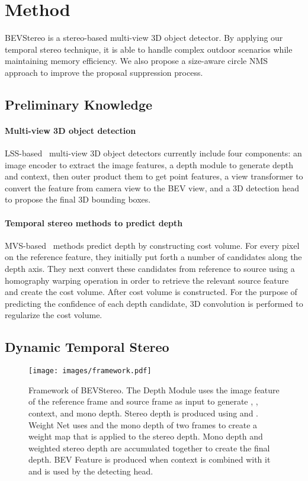 \documentclass[letterpaper]{article} \usepackage[]{aaai23}  \usepackage{times}  \usepackage{helvet}  \usepackage{courier}  \usepackage[hyphens]{url}  \usepackage{graphicx} \urlstyle{rm} \def\UrlFont{\rm}  \usepackage{natbib}  \usepackage{caption} \frenchspacing  \setlength{\pdfpagewidth}{8.5in} \setlength{\pdfpageheight}{11in} \usepackage{algorithm}
\begin{document}
\section{Method}
BEVStereo is a stereo-based multi-view 3D object detector.
By applying our temporal stereo technique, it is able to handle complex outdoor scenarios while maintaining memory efficiency. We also propose a size-aware circle NMS approach to improve the proposal suppression process.

\subsection{Preliminary Knowledge}
\paragraph{Multi-view 3D object detection}
LSS-based~\cite{philion2020lift} multi-view 3D object detectors currently include four components: an image encoder to extract the image features, a depth module to generate depth and context, then outer product them to get point features, a view transformer to convert the feature from camera view to the BEV view, and a 3D detection head to propose the final 3D bounding boxes.
\paragraph{Temporal stereo methods to predict depth}
MVS-based~\cite{yao2018mvsnet} methods predict depth by constructing cost volume. For every pixel on the reference feature, they initially put forth a number of candidates along the depth axis. They next convert these candidates from reference to source using a homography warping operation in order to retrieve the relevant source feature and create the cost volume. After cost volume is constructed. For the purpose of predicting the confidence of each depth candidate, 3D convolution is performed to regularize the cost volume.

\subsection{Dynamic Temporal Stereo}
\begin{figure*}[t]
\texttt{[image: images/framework.pdf]}
\centering
\caption{Framework of BEVStereo. The Depth Module uses the image feature of the reference frame and source frame as input to generate , , context, and mono depth. Stereo depth is produced using  and . Weight Net uses  and the mono depth of two frames to create a weight map that is applied to the stereo depth. Mono depth and weighted stereo depth are accumulated together to create the final depth. BEV Feature is produced when context is combined with it and is used by the detecting head.}
\label{fig:bevdepth}
\end{figure*}
\end{document}
